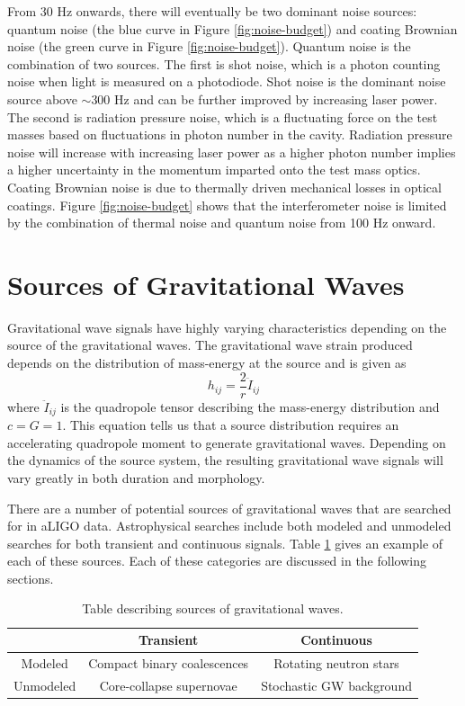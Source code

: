From 30 Hz onwards, there will eventually be two dominant noise sources: quantum noise 
(the blue curve in Figure \ref{fig:noise-budget}) 
and coating Brownian noise (the green curve in Figure \ref{fig:noise-budget}). 
Quantum noise is the combination of two sources. 
The first is shot noise, which is a photon counting noise when light is measured 
on a photodiode. Shot noise is the dominant noise source above $\sim$300 Hz and 
can be further improved by increasing laser power. 
The second is radiation pressure noise, which is a fluctuating 
force on the test masses based on fluctuations in photon number in the cavity. 
Radiation pressure noise will increase with increasing laser power as 
a higher photon number implies a higher uncertainty in the momentum 
imparted onto the test mass optics.
Coating Brownian noise is due to thermally driven mechanical losses in optical 
coatings. 
Figure \ref{fig:noise-budget} shows that the interferometer noise is 
limited by the combination of thermal noise and quantum noise from 100 Hz 
onward. 

\section{Sources of Gravitational Waves}

Gravitational wave signals have highly 
varying characteristics depending on the source of the gravitational 
waves. The gravitational wave strain produced depends on the distribution 
of mass-energy at the source and is given as
\begin{equation}
h_{ij} = \frac{2}{r}\ddot{I}_{ij}
\end{equation}
where $\ddot{I}_{ij}$ is the quadropole tensor describing the 
mass-energy distribution and $c=G=1$. This equation tells us that 
a source distribution requires an accelerating quadropole moment to 
generate gravitational waves. Depending on the dynamics of the source 
system, the resulting gravitational wave signals will vary greatly in 
both duration and morphology.

There are a number of potential sources of gravitational waves that are 
searched for in aLIGO data. Astrophysical searches include both modeled and unmodeled 
searches for both transient and continuous signals. Table \ref{tab:sources} 
gives an example of each of these sources. Each of these categories are 
discussed in the following sections.

\begin{table}[!ht]%
  \begin{tabular}{|c|c|c|}
  \hline
    & Transient  & Continuous  \\
  \hline
  Modeled & Compact binary coalescences & Rotating neutron stars  \\
  \hline
  Unmodeled & Core-collapse supernovae & Stochastic GW background \\
  \hline
  \end{tabular}
  \caption[Table of GW sources]{Table describing sources of %
           gravitational waves.}
  \label{tab:sources}
\end{table}

